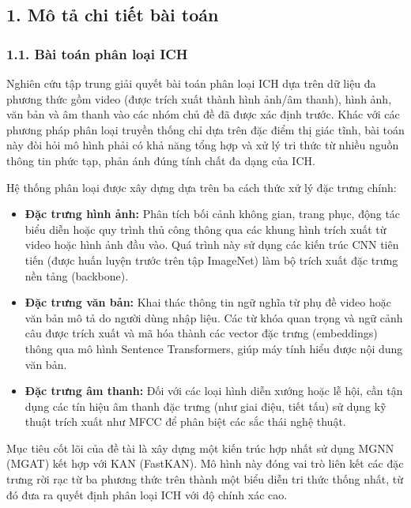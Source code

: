 \subsection{1. Mô tả chi tiết bài toán}
\subsubsection{1.1. Bài toán phân loại ICH}
\indent\indent Nghiên cứu tập trung giải quyết bài toán phân loại ICH dựa trên dữ liệu đa phương thức gồm video (được trích xuất thành hình ảnh/âm thanh), hình ảnh, văn bản và âm thanh vào các nhóm chủ đề đã được xác định trước. Khác với các phương pháp phân loại truyền thống chỉ dựa trên đặc điểm thị giác tĩnh, bài toán này đòi hỏi mô hình phải có khả năng tổng hợp và xử lý tri thức từ nhiều nguồn thông tin phức tạp, phản ánh đúng tính chất đa dạng của ICH.\vspace{0.3cm}

Hệ thống phân loại được xây dựng dựa trên ba cách thức xử lý đặc trưng chính:\vspace{-0.1cm}
\begin{itemize}[label={--}, itemsep=1pt]
    \item \textbf{Đặc trưng hình ảnh:} Phân tích bối cảnh không gian, trang phục, động tác biểu diễn hoặc quy trình thủ công thông qua các khung hình trích xuất từ video hoặc hình ảnh đầu vào. Quá trình này sử dụng các kiến trúc CNN tiên tiến (được huấn luyện trước trên tập ImageNet) làm bộ trích xuất đặc trưng nền tảng (backbone).
    \item \textbf{Đặc trưng văn bản:} Khai thác thông tin ngữ nghĩa từ phụ đề video hoặc văn bản mô tả do người dùng nhập liệu. Các từ khóa quan trọng và ngữ cảnh câu được trích xuất và mã hóa thành các vector đặc trưng (embeddings) thông qua mô hình Sentence Transformers, giúp máy tính hiểu được nội dung văn bản.
    \item \textbf{Đặc trưng âm thanh:} Đối với các loại hình diễn xướng hoặc lễ hội, cần tận dụng các tín hiệu âm thanh đặc trưng (như giai điệu, tiết tấu) sử dụng kỹ thuật trích xuất như MFCC để phân biệt các sắc thái nghệ thuật.
\end{itemize}

Mục tiêu cốt lõi của đề tài là xây dựng một kiến trúc hợp nhất sử dụng MGNN (MGAT) kết hợp với KAN (FastKAN). Mô hình này đóng vai trò liên kết các đặc trưng rời rạc từ ba phương thức trên thành một biểu diễn tri thức thống nhất, từ đó đưa ra quyết định phân loại ICH với độ chính xác cao.

